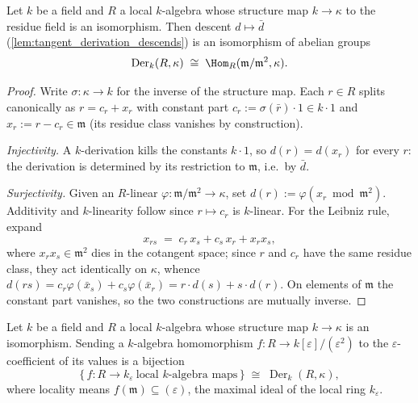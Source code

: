 \begin{lemma}\leanok
  \label{lem:tangent_derivation_cotangent_dual}
  Let \(k\) be a field and \(R\) a local \(k\)-algebra whose
  structure map \(k \to \kappa\) to the residue field is an
  isomorphism. Then descent \(d \mapsto \bar d\)
  (\cref{lem:tangent_derivation_descends}) is an isomorphism of
  abelian groups
  \[
    \operatorname{Der}_k(R, \kappa)
    \;\cong\;
    \Hom_R(\mathfrak m/\mathfrak m^2, \kappa).
  \]
\end{lemma}

\begin{proof}\leanok
  Write \(\sigma : \kappa \to k\) for the inverse of the structure
  map. Each \(r \in R\) splits canonically as
  \(r = c_r + x_r\) with constant part
  \(c_r := \sigma(\bar r) \cdot 1 \in k \cdot 1\) and
  \(x_r := r - c_r \in \mathfrak m\) (its residue class vanishes by
  construction).

  \emph{Injectivity.} A \(k\)-derivation kills the constants
  \(k \cdot 1\), so \(d(r) = d(x_r)\) for every \(r\): the derivation
  is determined by its restriction to \(\mathfrak m\), i.e.\ by
  \(\bar d\).

  \emph{Surjectivity.} Given an \(R\)-linear
  \(\varphi : \mathfrak m/\mathfrak m^2 \to \kappa\), set
  \(d(r) := \varphi(x_r \bmod \mathfrak m^2)\). Additivity and
  \(k\)-linearity follow since \(r \mapsto c_r\) is \(k\)-linear. For
  the Leibniz rule, expand
  \[
    x_{rs} \;=\; c_r\, x_s + c_s\, x_r + x_r x_s ,
  \]
  where \(x_r x_s \in \mathfrak m^2\) dies in the cotangent space;
  since \(r\) and \(c_r\) have the same residue class, they act
  identically on \(\kappa\), whence
  \(d(rs) = c_r \varphi(\bar x_s) + c_s \varphi(\bar x_r)
    = r \cdot d(s) + s \cdot d(r)\).
  On elements of \(\mathfrak m\) the constant part vanishes, so the
  two constructions are mutually inverse.
\end{proof}

\begin{lemma}\leanok
  \label{lem:tangent_dual_number_derivation}
  Let \(k\) be a field and \(R\) a local \(k\)-algebra whose
  structure map \(k \to \kappa\) is an isomorphism. Sending a
  \(k\)-algebra homomorphism \(f : R \to k[\varepsilon]/(\varepsilon^2)\)
  to the \(\varepsilon\)-coefficient of its values is a bijection
  \[
    \{\, f : R \to k_\varepsilon \ \text{local $k$-algebra maps} \,\}
    \;\cong\;
    \operatorname{Der}_k(R, \kappa),
  \]
  where locality means \(f(\mathfrak m) \subseteq (\varepsilon)\),
  the maximal ideal of the local ring \(k_\varepsilon\).
\end{lemma}

